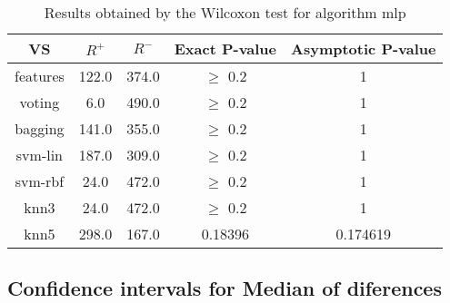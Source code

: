 \documentclass[a4paper,10pt]{article}
\begin{document}
\begin{table}[!htp]
\centering\small
\begin{tabular}{
|c|c|c|c|c|}
\hline
 VS & $R^{+}$ & $R^{-}$ & Exact P-value & Asymptotic P-value \\ \hline 
features & 122.0 & 374.0 & $\geq$ 0.2 & 1\\ \hline 
voting & 6.0 & 490.0 & $\geq$ 0.2 & 1\\ \hline 
bagging & 141.0 & 355.0 & $\geq$ 0.2 & 1\\ \hline 
svm-lin & 187.0 & 309.0 & $\geq$ 0.2 & 1\\ \hline 
svm-rbf & 24.0 & 472.0 & $\geq$ 0.2 & 1\\ \hline 
knn3 & 24.0 & 472.0 & $\geq$ 0.2 & 1\\ \hline 
knn5 & 298.0 & 167.0 & 0.18396 & 0.174619\\ \hline 

\end{tabular}
\caption{Results obtained by the Wilcoxon test for algorithm mlp}
\end{table}

\subsection{Confidence intervals for Median of diferences}
\end{document}
